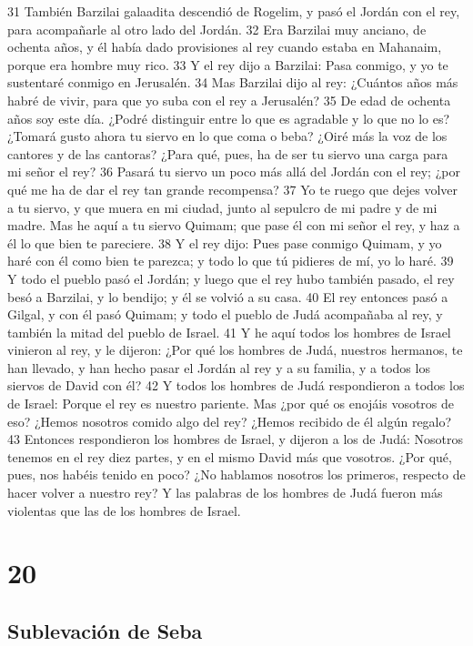 31 También Barzilai galaadita descendió de Rogelim, y pasó el Jordán con el rey, para acompañarle al otro lado del Jordán.
32 Era Barzilai muy anciano, de ochenta años, y él había dado provisiones al rey cuando estaba en Mahanaim, porque era hombre muy rico.
33 Y el rey dijo a Barzilai: Pasa conmigo, y yo te sustentaré conmigo en Jerusalén.
34 Mas Barzilai dijo al rey: ¿Cuántos años más habré de vivir, para que yo suba con el rey a Jerusalén?
35 De edad de ochenta años soy este día. ¿Podré distinguir entre lo que es agradable y lo que no lo es? ¿Tomará gusto ahora tu siervo en lo que coma o beba? ¿Oiré más la voz de los cantores y de las cantoras? ¿Para qué, pues, ha de ser tu siervo una carga para mi señor el rey?
36 Pasará tu siervo un poco más allá del Jordán con el rey; ¿por qué me ha de dar el rey tan grande recompensa?
37 Yo te ruego que dejes volver a tu siervo, y que muera en mi ciudad, junto al sepulcro de mi padre y de mi madre. Mas he aquí a tu siervo Quimam; que pase él con mi señor el rey, y haz a él lo que bien te pareciere.
38 Y el rey dijo: Pues pase conmigo Quimam, y yo haré con él como bien te parezca; y todo lo que tú pidieres de mí, yo lo haré.
39 Y todo el pueblo pasó el Jordán; y luego que el rey hubo también pasado, el rey besó a Barzilai, y lo bendijo; y él se volvió a su casa.
40 El rey entonces pasó a Gilgal, y con él pasó Quimam; y todo el pueblo de Judá acompañaba al rey, y también la mitad del pueblo de Israel.
41 Y he aquí todos los hombres de Israel vinieron al rey, y le dijeron: ¿Por qué los hombres de Judá, nuestros hermanos, te han llevado, y han hecho pasar el Jordán al rey y a su familia, y a todos los siervos de David con él?
42 Y todos los hombres de Judá respondieron a todos los de Israel: Porque el rey es nuestro pariente. Mas ¿por qué os enojáis vosotros de eso? ¿Hemos nosotros comido algo del rey? ¿Hemos recibido de él algún regalo?
43 Entonces respondieron los hombres de Israel, y dijeron a los de Judá: Nosotros tenemos en el rey diez partes, y en el mismo David más que vosotros. ¿Por qué, pues, nos habéis tenido en poco? ¿No hablamos nosotros los primeros, respecto de hacer volver a nuestro rey? Y las palabras de los hombres de Judá fueron más violentas que las de los hombres de Israel.

\chapter{20}

\section*{Sublevación de Seba}

